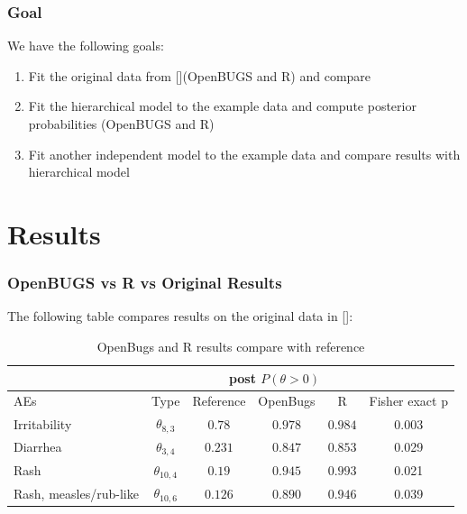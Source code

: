 \documentclass{beamer}[10]
\begin{document}
\begin{frame}
	\frametitle{Goal}
	We have the following goals:
	\begin{block}{ }
		\begin{enumerate}
			\item Fit the original data from [\cite{Berry04}](OpenBUGS and R) and compare
			\item Fit the hierarchical model to the example data and compute posterior probabilities (OpenBUGS and R)
			\item Fit another independent model to the example data and compare results with hierarchical model
		\end{enumerate}
	\end{block}
\end{frame}

\section{Results}
\begin{frame}
	\frametitle{OpenBUGS vs R vs Original Results}
	The following table compares results on the original data in [\cite{Berry04}]:
	\begin{table}[ht]
  \centering
  \tiny
  \begin{tabular}{|l|c|c|c|c|c|}
  \hline
  \cline{1-2}\cline{3-5}
  \multicolumn{2}{|c|}{}& \multicolumn{3}{|c|}{post $P(\theta > 0)$} & \\
    \hline
  AEs& Type & Reference & OpenBugs & R & Fisher exact p\\
    \hline
    Irritability & $\theta_{8, 3}$ & $0.78$ & $0.978$ & $0.984$ & 0.003\\
    Diarrhea &  $\theta_{3, 4}$ & $0.231$ & $0.847$ & $0.853$  & 0.029\\
    Rash & $\theta_{10, 4}$ & $0.19$ & $0.945$ & $0.993$ & 0.021\\
    Rash, measles/rub-like & $\theta_{10, 6}$ & $0.126$ & $0.890$ & $0.946$ & 0.039\\
  \hline
  \end{tabular}
  \caption{OpenBugs and R results compare with reference}\label{tab:berry_compare}
\end{table}
\end{frame}
\end{document}
